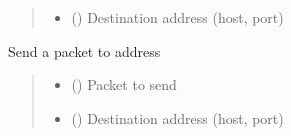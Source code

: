 \documentclass[letterpaper,10pt,english]{sphinxmanual}
\begin{document}
\begin{fulllineitems}
\begin{fulllineitems}
\begin{quote}
\begin{description}
\begin{itemize}
\item {} 
\sphinxAtStartPar
{} () \textendash{} Destination address (host, port)

\end{itemize}

\end{description}\end{quote}

\end{fulllineitems}


\begin{fulllineitems}
\label{\detokenize{sender:sender.Sender.send_packet}}
\pysigstartsignatures
\pysiglinewithargsret
{}
{\sphinxparamcomma {}}
{}
\pysigstopsignatures
\sphinxAtStartPar
Send a packet to address
\begin{quote}\begin{description}
\begin{itemize}
\item {} 
\sphinxAtStartPar
{} ({\hyperref[\detokenize{packet:packet.Packet}]{}}) \textendash{} Packet to send

\item {} 
\sphinxAtStartPar
{} () \textendash{} Destination address (host, port)

\end{itemize}

\end{description}\end{quote}

\end{fulllineitems}


\end{fulllineitems}
\end{document}
